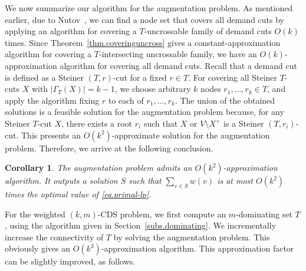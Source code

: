 \documentclass[11pt]{article}
\newtheorem{corollary}{Corollary}
\begin{document}
  We now summarize our algorithm for the augmentation problem.
  As mentioned earlier, 
  due to Nutov~\cite{Nutov12},
  we can find a node set that covers all demand cuts
  by applying an
  algorithm for covering a $T$-uncrossable family of demand cuts $O(k)$
  times.
Since Theorem~\ref{thm.coveringuncross} gives a constant-approximation algorithm
  for covering a $T$-intersecting uncrossable family,
  we have an $O(k)$-approximation algorithm for covering all demand
  cuts.
  Recall that a demand cut is defined as a Steiner $(T,r)$-cut for a
  fixed $r \in T$.
  For covering all Steiner $T$-cuts $X$ with $|\Gamma_T(X)|=k-1$,
  we choose arbitrary $k$ nodes $r_1,\ldots,r_k \in T$,
  and apply the algorithm fixing $r$ to each of $r_1,\ldots,r_k$.
  The union of the obtained solutions is
  a feasible solution for the augmentation problem
  because, for any Steiner $T$-cut $X$,
  there exists a root $r_i$ such that $X$ or $V \setminus X^+$ is a
  Steiner $(T,r_i)$-cut.
  This presents 
  an $O(k^2)$-approximate
  solution for the augmentation problem.
  Therefore, we arrive at the following conclusion.

   \begin{corollary}
    \label{cor.augmentation}
    The augmentation problem admits 
    an $O(k^2)$-approximation algorithm.
    It outputs a solution $S$ such that $\sum_{v \in S}w(v)$
   is at most $O(k^2)$ times the optimal value of \eqref{eq.primal-lp}.
   \end{corollary}
  

  
 For the weighted $(k,m)$-CDS problem,
 we first compute an $m$-dominating set $T$, using the algorithm given in
 Section~\ref{subs.dominating}.
 We incrementally increase the connectivity of $T$ 
 by solving the augmentation problem.
 This obviously gives an $O(k^3)$-approximation algorithm.
 This approximation factor can be slightly improved, as follows.
\end{document}
